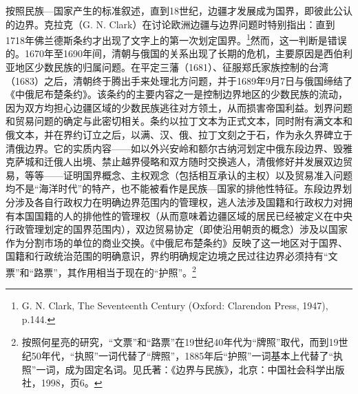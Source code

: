 \documentclass[a4paper, 12pt, openright]{ctexbook}
\begin{document}
按照民族—国家产生的标准叙述，直到18世纪，边疆才发展成为国界，即彼此公认的边界。克拉克（G. N. Clark）在讨论欧洲边疆与边界问题时特别指出：直到1718年佛兰德斯条约才出现了文字上的第一次划定国界。\footnote{G. N. Clark, The Seventeenth Century (Oxford: Clarendon Press, 1947), p.144.}然而，这一判断是错误的。1670年至1690年间，清朝与俄国的关系出现了长期的危机，主要原因是西伯利亚地区少数民族的归属问题。在平定三藩（1681）、征服郑氏家族控制的台湾（1683）之后，清朝终于腾出手来处理北方问题，并于1689年9月7日与俄国缔结了《中俄尼布楚条约》。该条约的主要内容之一是控制边界地区的少数民族的流动，因为双方均担心边疆区域的少数民族逃往对方领土，从而损害帝国利益。划界问题和贸易问题的确定与此密切相关。条约以拉丁文本为正式文本，同时附有满文本和俄文本，并在界约订立之后，以满、汉、俄、拉丁文刻之于石，作为永久界碑立于清俄边界。它的实质内容——如以外兴安岭和额尔古纳河划定中俄东段边界、毁雅克萨城和迁俄人出境、禁止越界侵略和双方随时交换逃人，清俄修好并发展双边贸易，等等——证明国界概念、主权观念（包括相互承认的主权）以及贸易准入问题均不是“海洋时代”的特产，也不能被看作是民族—国家的排他性特征。东段边界划分涉及各自行政权力在明确边界范围内的管理权，逃人法涉及国籍和行政权力对拥有本国国籍的人的排他性的管理权（从而意味着边疆区域的居民已经被定义在中央行政管理划定的国界范围内），双边贸易协定（即使沿用朝贡的概念）涉及以国家作为分割市场的单位的商业交换。《中俄尼布楚条约》反映了这一地区对于国界、国籍和行政统治范围的明确意识，界约明确规定边境之民过往边界必须持有“文票”和“路票”，其作用相当于现在的“护照”。\footnote{按照何星亮的研究，“文票”和“路票”在19世纪40年代为“牌照”取代，而到19世纪50年代，“执照”一词代替了“牌照”，1885年后“护照”一词基本上代替了“执照”一词，成为固定名词。见氏著：《边界与民族》，北京：中国社会科学出版社，1998，页6。}
\end{document}
